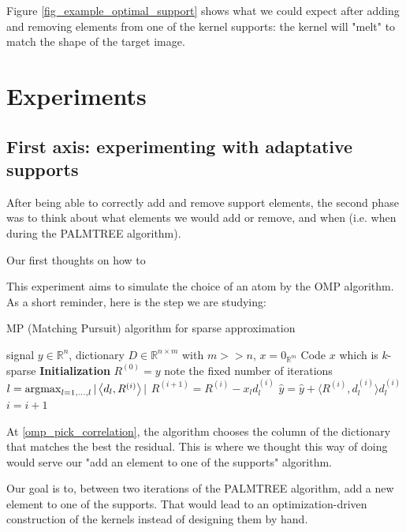 Figure \ref{fig_example_optimal_support} shows what we could expect after adding and removing elements from one of the kernel supports: the kernel will "melt" to match the shape of the target image.


\chapter{Experiments}

\section{First axis: experimenting with adaptative supports}

After being able to correctly add and remove support elements, the second phase was to think about what elements we would add or remove, and when (i.e. when during the PALMTREE algorithm).

Our first thoughts on how to 

This experiment aims to simulate the choice of an atom by the OMP algorithm. As a short reminder, here is the step we are studying:
\begin{algorithm} %
    \caption{MP (Matching Pursuit) algorithm for sparse approximation}
  \begin{algorithmic}[1]
    \Input signal $y \in \mathbb{R}^{n}$, dictionary $D \in \mathbb{R}^{n \times m}$ with $m>>n$, $x = 0_{\mathbb{R}^m}$
    \Output Code $x$ which is $k$-sparse
    \State \textbf{Initialization} $R^{(0)} = y$
     \Comment note the fixed number of iterations
      \State $l =  \operatorname*{\arg\!\max}_{l = 1,\dots,l} |\left< d_l,R^{(i)} \right>|$ \label{omp_pick_correlation}
      \State $R^{(i+1)} = R^{(i)}-x_l d_l^{(i)}$
      \State $\hat{y} = \hat{y}+\langle R^{(i)}, d_{l}^{(i)} \rangle d_{l}^{(i)}$
      \State $i = i + 1$
    \EndWhile
  \end{algorithmic}
\end{algorithm}

At \cref{omp_pick_correlation}, the algorithm chooses the column of the dictionary that matches the best the residual. This is where we thought this way of doing would serve our "add an element to one of the supports" algorithm.

Our goal is to, between two iterations of the PALMTREE algorithm, add a new element to one of the supports. That would lead to an optimization-driven construction of the kernels instead of designing them by hand.

